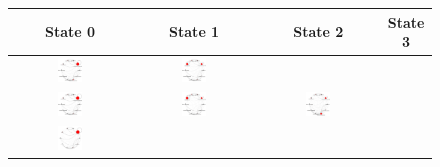 \begin{figure}
  \centering
  \begin{tabular}{cccc}
    \textbf{State 0} & \textbf{State 1} & \textbf{State 2} & \textbf{State
    3}\\\hline
    \includegraphics[width=0.22\textwidth]{figures/text-2state/state0.png}
    &
    \includegraphics[width=0.22\textwidth]{figures/text-2state/state1.png}\\
    \includegraphics[width=0.22\textwidth]{figures/text-3state/state0.png}
    &
    \includegraphics[width=0.22\textwidth]{figures/text-3state/state1.png}
    &
    \includegraphics[width=0.22\textwidth]{figures/text-3state/state2.png}\\
    \includegraphics[width=0.22\textwidth]{figures/text-4state/state0.png}

\end{tabular}
\end{figure}

